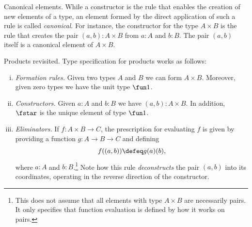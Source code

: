\begin{lpar}{Canonical elements.}\label{lpar:canonical-elements}
    While a constructor is the rule that enables the creation of new elements of a type, an element formed by the direct application of such a rule is called \textsl{canonical}. For instance, the constructor for the type $A\times B$ is the rule that creates the pair $(a,b)\colon A\times B$ from $a\colon A$ and $b\colon B$. The pair $(a,b)$ itself is a canonical element of $A\times B$.
\end{lpar}

\begin{lpar}{Products revisited.}\label{lpar:products-revisited}
    Type specification for products works as follows:
    \begin{enumerate}[i),font=\scshape]
        \item \textit{Formation rules.} Given two types $A$ and $B$ we can form $A\times B$. Moreover, given zero types we have the unit type $\fun1$.

        \item \textit{Constructors.} Given $a\colon A$ and $b\colon B$ we have $(a,b)\colon A\times B$. In addition, $\fstar$ is the unique element of type $\fun1$.

        \item \textit{Eliminators.} If $f\colon A\times B\to C$, the prescription for evaluating $f$ is given by providing a function $g\colon A\to B\to C$ and defining
        \[
            f((a,b)) \defeq g(a)(b),
        \]
        where $a\colon A$ and $b\colon B$.\footnote{This does not assume that all elements with type $A\times B$ are necessarily pairs. It only specifies that function evaluation is defined by how it works on pairs.} Note how this rule \textit{deconstructs} the pair $(a,b)$ into its coordinates, operating in the reverse direction of the constructor.


\end{enumerate}
\end{lpar}
